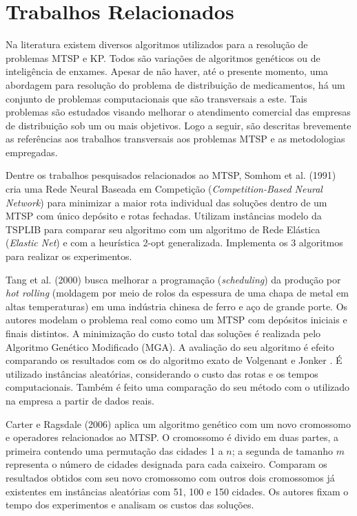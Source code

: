 \chapter{Trabalhos Relacionados}

Na literatura existem diversos algoritmos utilizados para a resolução de problemas MTSP e KP. Todos são variações de algoritmos genéticos ou de inteligência de enxames. Apesar de não haver, até o presente momento, uma abordagem para resolução do problema de distribuição de medicamentos, há um conjunto de problemas computacionais que são transversais a este. Tais problemas são estudados visando melhorar o atendimento comercial das empresas de distribuição sob um ou mais objetivos. Logo a seguir, são descritas brevemente as referências aos trabalhos transversais aos problemas MTSP e as metodologias empregadas.

Dentre os trabalhos pesquisados relacionados ao MTSP, Somhom et al. (1991) \cite{somhom1999competition} cria uma Rede Neural Baseada em Competição (\textit{Competition-Based Neural Network}) para minimizar a maior rota individual das soluções dentro de um MTSP com único depósito e rotas fechadas. Utilizam instâncias modelo da TSPLIB \cite{reinelt1991tsplib} para comparar seu algoritmo com um algoritmo de Rede Elástica (\textit{Elastic Net}) e com a heurística 2-opt generalizada. Implementa os 3 algoritmos para realizar os experimentos.

Tang et al. (2000) \cite{tang2000multiple} busca melhorar a programação (\textit{scheduling}) da produção por \textit{hot rolling} (moldagem por meio de rolos da espessura de uma chapa de metal em altas temperaturas) em uma indústria chinesa de ferro e aço de grande porte. Os autores modelam o problema real como como um MTSP com depósitos iniciais e finais distintos. A minimização do custo total das soluções é realizada pelo Algoritmo Genético Modificado (MGA). A avaliação do seu algoritmo é efeito comparando os resultados com os do algoritmo exato de Volgenant e Jonker \cite{tang2000multiple}. É utilizado instâncias aleatórias, considerando o custo das rotas e os tempos computacionais. Também é feito uma comparação do seu método com o utilizado na empresa a partir de dados reais.

Carter e Ragsdale (2006) \cite{carter2006new} aplica um algoritmo genético com um novo cromossomo e operadores relacionados ao MTSP. O cromossomo é divido em duas partes, a primeira contendo uma permutação das cidades 1 a $n$; a segunda de tamanho $m$ representa o número de cidades designada para cada caixeiro. Comparam os resultados obtidos com seu novo cromossomo com outros dois cromossomos já existentes em instâncias aleatórias com 51, 100 e 150 cidades. Os autores fixam o tempo dos experimentos e analisam os custos das soluções.

